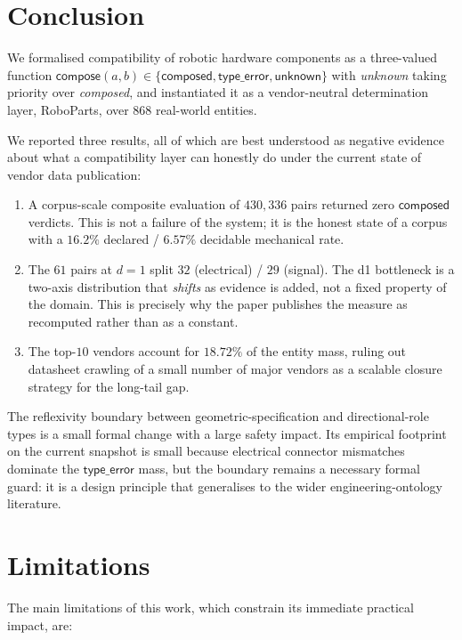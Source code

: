 \documentclass[11pt,twocolumn]{article}
\begin{document}
\section{Conclusion}

We formalised compatibility of robotic hardware components as a
three-valued function
$\mathsf{compose}(a, b) \in \{\mathsf{composed}, \mathsf{type\_error},
\mathsf{unknown}\}$ with \emph{unknown} taking priority over
\emph{composed}, and instantiated it as a vendor-neutral determination
layer, RoboParts, over $868$ real-world entities.

We reported three results, all of which are best understood as
negative evidence about what a compatibility layer can honestly do
under the current state of vendor data publication:

\begin{enumerate}[nosep]
\item A corpus-scale composite evaluation of $430{,}336$ pairs
returned zero $\mathsf{composed}$ verdicts. This is not a failure of
the system; it is the honest state of a corpus with a $16.2\%$
declared / $6.57\%$ decidable mechanical rate.

\item The $61$ pairs at $d=1$ split $32$ (electrical) / $29$
(signal). The d1 bottleneck is a two-axis distribution that
\emph{shifts} as evidence is added, not a fixed property of the
domain. This is precisely why the paper publishes the measure as
recomputed rather than as a constant.

\item The top-$10$ vendors account for $18.72\%$ of the entity mass,
ruling out datasheet crawling of a small number of major vendors as
a scalable closure strategy for the long-tail gap.
\end{enumerate}

The reflexivity boundary between geometric-specification and
directional-role types is a small formal change with a large safety
impact. Its empirical footprint on the current snapshot is small
because electrical connector mismatches dominate the $\mathsf{type\_error}$
mass, but the boundary remains a necessary formal guard: it is a
design principle that generalises to the wider engineering-ontology
literature.

\section{Limitations}

The main limitations of this work, which constrain its immediate
practical impact, are:
\end{document}
